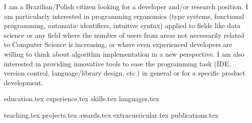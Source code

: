 \documentclass[letterpaper,11pt]{article}
\begin{document}


\vspace{0.35cm}
I am a Brazilian/Polish citizen looking for a developer and/or research position. 
I am particularly interested in programming ergonomics (type systems, functional programming, automatic identifiers, intuitive syntax) applied to fields like data science or any field where the number of users from areas not necessarily related to Computer Science is increasing, or where even experienced developers are willing to think about algorithm implementation in a new perspective.
I am also interested in providing innovative tools to ease the programming task (IDE, version control, language/library design, etc.) in general or for a specific product development.

{education.tex}
{experience.tex}
\sidebyside
    {{skills.tex}}
    {{languages.tex}}


{teaching.tex}
{projects.tex}
{awards.tex}
{extracurricular.tex}
{publications.tex}
\end{document}
